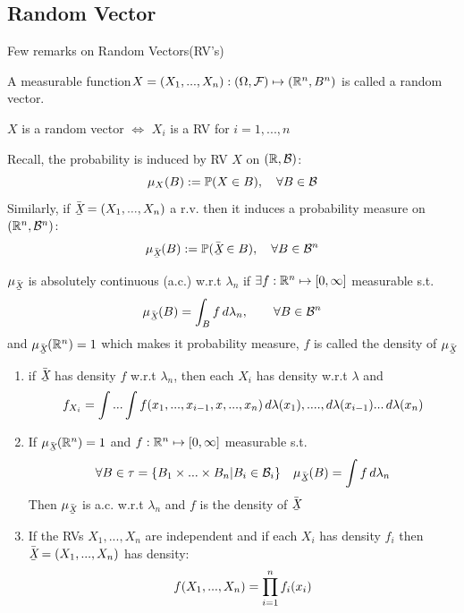 \subsection{Random Vector}
Few remarks on Random Vectors(RV's)
\begin{dfn}
A measurable function$X=(X_1, ..., X_n): (\Omega, \mathcal{F}) \mapsto (\mathbb{R}^n, B^n)$ is called a random vector.
\end{dfn}
\begin{ex}
$X$ is a random vector $\Longleftrightarrow$ $X_i$ is a RV for $i=1,...,n$
\end{ex}
Recall, the probability is induced by RV $X$ on $(\mathbb{R}, \mathcal{B})$:
\begin{equation*}
    \mu_X(B) := \mathbb{P}(X\in B), \quad \forall B\in\mathcal{B}
\end{equation*}Similarly, if $\doublebar{X} = (X_1,...,X_n)$ a r.v. then it induces a probability measure on $(\mathbb{R}^n, \mathcal{B}^n)$:
\begin{equation*}
    \mu_{\doublebar{X}} (B) := \prob(\doublebar{X}\in B), \quad \forall B\in\B^n
\end{equation*}
\begin{dfn} $\mu_{\doublebar{X}}$ is absolutely continuous (a.c.) w.r.t $\lambda_n$ if $\exists f: \mathbb{R}^n \mapsto [0, \infty]$ measurable s.t. 
\begin{equation*}
    \mu_{\doublebar{X}} (B) = \int_B f \diff\lambda_n, \qquad \forall B\in \B^n
\end{equation*}and $\mu_{\doublebar{X}}(\R^n)=1$ which makes it probability measure,  $f$ is called the density of $\mu_{\doublebar{X}}$
\end{dfn}
\begin{ex}
\begin{enumerate}
    \item if $\doublebar{X}$ has density $f$ w.r.t $\lambda_n$, then each $X_i$ has density w.r.t $\lambda$ and 
    \begin{equation*}
        f_{X_i} = \int ... \int f(x_1, ..., x_{i-1}, x, ...,x_n) \mathop{}\!d \lambda(x_1) ,...., \mathop{}\!d \lambda(x_{i-1}) ...\mathop{}\!d \lambda(x_n)
    \end{equation*}
    \item If $\mu_{\doublebar{X}}(\R^n)=1$ and $f: \mathbb{R}^n \mapsto [0,\infty]$ measurable s.t. 
    \begin{equation*}
        \forall B\in \tau = \{B_1 \times ... \times B_n|B_i\in \B_i\} \quad \mu_{\doublebar{X}}(B) = \int f \diff\lambda_n
    \end{equation*}Then $\mu_{\doublebar{X}}$ is a.c. w.r.t $\lambda_n$ and $f$ is the density of $\doublebar{X}$
    \item If the RVs $X_1,...,X_n$ are independent and if each $X_i$ has density $f_i$ then $\doublebar{X} = (X_1,...,X_n)$ has density:
    \begin{equation*}
        f(X_1,...,X_n) = \prod\limits_{i=1}^n f_i(x_i)
    \end{equation*}
\end{enumerate}
\end{ex}
\newpage
